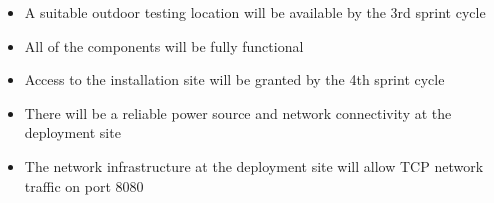 \begin{itemize}
  \item A suitable outdoor testing location will be available by the 3rd sprint cycle
  \item All of the components will be fully functional
  \item Access to the installation site will be granted by the 4th sprint cycle
  \item There will be a reliable power source and network connectivity at the deployment site
  \item The network infrastructure at the deployment site will allow TCP network traffic on port 8080
\end{itemize}